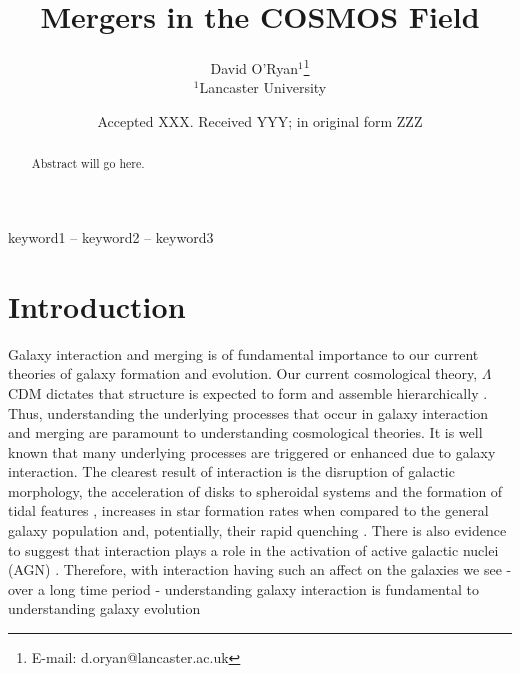\documentclass[fleqn,usenatbib]{mnras}
\title[Mergers in COSMOS]{Mergers in the COSMOS Field}
\author[D. O'Ryan et al.]{
David O'Ryan$^{1}$\thanks{E-mail: d.oryan@lancaster.ac.uk}
\\
$^{1}$Lancaster University \\
}
\date{Accepted XXX. Received YYY; in original form ZZZ}
\begin{document}
\label{firstpage}
\pagerange{\pageref{firstpage}--\pageref{lastpage}}
\maketitle

\begin{abstract}
   Abstract will go here.
\end{abstract}

\begin{keywords}
keyword1 -- keyword2 -- keyword3
\end{keywords}


\section{Introduction}\label{introduction}
\noindent Galaxy interaction and merging is of fundamental importance to our current theories of galaxy formation and evolution. Our current cosmological theory, $\Lambda$CDM dictates that structure is expected to form and assemble hierarchically \citep{1978MNRAS.183..341W, 2013MNRAS.436.1765M}. Thus, understanding the underlying processes that occur in galaxy interaction and merging are paramount to understanding cosmological theories. It is well known that many underlying processes are triggered or enhanced due to galaxy interaction. The clearest result of interaction is the disruption of galactic morphology, the acceleration of disks to spheroidal systems and the formation of tidal features \citep{1972ApJ...178..623T, 1977ApJ...212..616T, 2005MNRAS.357..753G, 2009MNRAS.397..802H}, increases in star formation rates when compared to the general galaxy population \citep{1991ApJ...370L..65B, 2006ApJ...652...56B, 2014MNRAS.437.2137S, 2015ApJ...807L..16K} and, potentially, their rapid quenching \citep{2013MNRAS.430.1901H, 2023RAA....23i5026D}. There is also evidence to suggest that interaction plays a role in the activation of active galactic nuclei (AGN) \citep{2011MNRAS.418.2043E, 2015ApJ...806..219C, 2023MNRAS.523.4164H}. Therefore, with interaction having such an affect on the galaxies we see - over a long time period - understanding galaxy interaction is fundamental to understanding galaxy evolution
\end{document}
